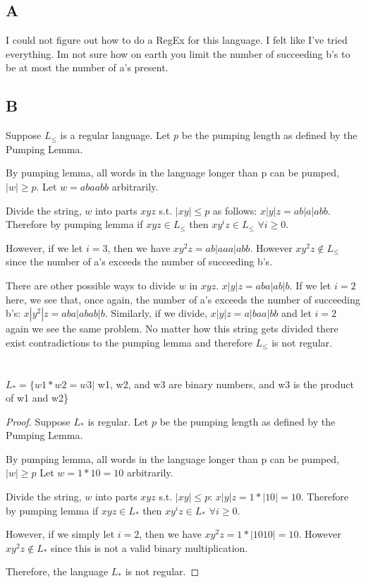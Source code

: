 \documentclass[12pt]{article}
\begin{document}
\subsection{A}

I could not figure out how to do a RegEx for this language. I felt like I've tried everything. Im not sure how on earth you limit the number of succeeding b's to be at most the number of a's present.

\subsection{B}

Suppose $L_{\leq}$ is a regular language. Let $p$ be the pumping length as defined by the Pumping Lemma. 

By pumping lemma, all words in the language longer than p can be pumped, $|w| \geq p$. Let $w = abaabb$ arbitrarily. 

Divide the string, $w$ into parts $xyz$ s.t. $|xy| \leq p$ as follows: $x|y|z = ab|a|abb$. Therefore by pumping lemma if $xyz \in L_{\leq}$ then $xy^i z \in L_{\leq}$ $\forall i \geq 0$. 

However, if we let $i=3$, then we have $xy^2 z = ab|aaa|abb$. However  $xy^2 z \notin L_{\leq}$ since the number of a's exceeds the number of succeeding b's.

There are other possible ways to divide $w$ in $xyz$. $x|y|z = aba|ab|b$. If we let $i=2$ here, we see that, once again, the number of a's exceeds the number of succeeding b's: $x|y^2|z = aba|abab|b$. Similarly, if we divide, $x|y|z = a|baa|bb$ and let $i=2$ again we see the same problem. No matter how this string gets divided there exist contradictions to the pumping lemma and therefore $L_{\leq}$ is not regular.


\pagebreak

\section{}

$L_{*} = \{w1*w2=w3 |$ w1, w2, and w3 are binary numbers, and w3 is the product of w1 and w2\}

\begin{proof}

Suppose $L_{*}$ is regular.  Let $p$ be the pumping length as defined by the Pumping Lemma. 

By pumping lemma, all words in the language longer than p can be pumped, $|w| \geq p$  Let $w = 1*10=10$ arbitrarily. 

Divide the string, $w$ into parts $xyz$ s.t. $|xy| \leq p$: $x|y|z = 1*|10|=10$. Therefore by pumping lemma if $xyz \in L_{*}$ then $xy^i z \in L_{*}$ $\forall i \geq 0$. 

However, if we simply let $i=2$, then we have $xy^2 z = 1*|1010| = 10$. However  $xy^2 z \notin L_{*}$ since this is not a valid binary multiplication.

Therefore, the language $L_{*}$ is not regular.

\end{proof}
\end{document}
